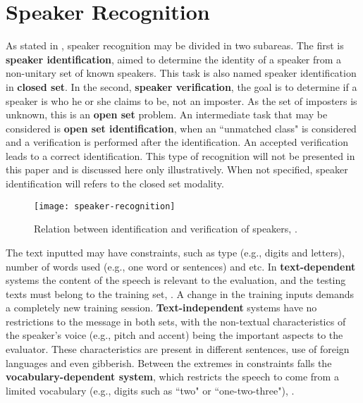 \section{Speaker Recognition}
\label{sec:speaker-recognition}

As stated in , speaker recognition may be divided in two subareas. The first is \textbf{speaker identification}, aimed to determine the identity of a speaker from a non-unitary set of known speakers. This task is also named speaker identification in \textbf{closed set}. In the second, \textbf{speaker verification}, the goal is to determine if a speaker is who he or she claims to be, not an imposter. As the set of imposters is unknown, this is an \textbf{open set} problem. An intermediate task that may be considered is \textbf{open set identification}, when an ``unmatched class" is considered and a verification is performed after the identification. An accepted verification leads to a correct identification. This type of recognition will not be presented in this paper and is discussed here only illustratively. When not specified, speaker identification will refers to the closed set modality.

\begin{figure}[ht]
    \centering
    \texttt{[image: speaker-recognition]}
    \caption{Relation between identification and verification of speakers, .}
    \label{fig:speaker-recognition}
\end{figure}

The text inputted may have constraints, such as type (e.g., digits and letters), number of words used (e.g., one word or sentences) and etc. In \textbf{text-dependent} systems the content of the speech is relevant to the evaluation, and the testing texts must belong to the training set, . A change in the training inputs demands a completely new training session. \textbf{Text-independent} systems have no restrictions to the message in both sets, with the non-textual characteristics of the speaker's voice (e.g., pitch and accent) being the important aspects to the evaluator. These characteristics are present in different sentences, use of foreign languages and even gibberish. Between the extremes in constraints falls the \textbf{vocabulary-dependent system}, which restricts the speech to come from a limited vocabulary (e.g., digits such as ``two" or ``one-two-three"), .

